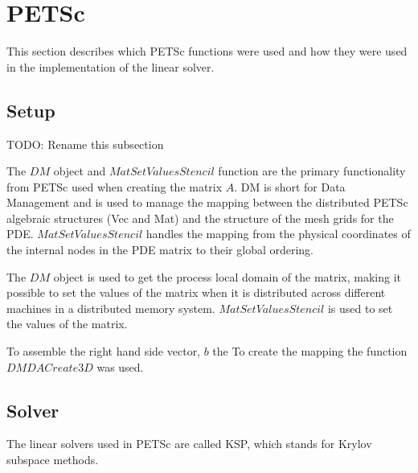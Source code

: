 \section{PETSc}

This section describes which PETSc functions were used and how they were used in 
the implementation of the linear solver\cite{petsc-user-ref}. 

\subsection{Setup}

TODO: Rename this subsection

The $DM$ object and $MatSetValuesStencil$ function are the primary functionality from 
PETSc used when creating the matrix $A$\cite{petsc-user-ref}. DM is short for 
Data Management and is used to manage the mapping between the distributed PETSc 
algebraic structures (Vec and Mat) and the structure of the mesh grids for the PDE. 
$MatSetValuesStencil$ handles the mapping from the physical coordinates of the 
internal nodes in the PDE matrix to their global ordering. 

The $DM$ object is used to get the process local domain of the matrix, 
making it possible to set the values of the matrix when it is distributed across 
different machines in a distributed memory system. $MatSetValuesStencil$ is used 
to set the values of the matrix.

To assemble the right hand side vector, $b$ the To create the mapping the function 
$DMDACreate3D$ was used.

\subsection{Solver}

The linear solvers used in PETSc are called KSP, which stands for Krylov subspace 
methods. 
